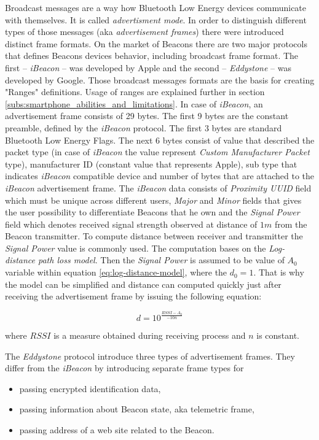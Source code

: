 \documentclass[../main.tex]{subfiles}
\begin{document}
Broadcast messages are a way how Bluetooth Low Energy devices communicate with themselves. It is called \textit{advertisment mode}. In order to distinguish different types of those messages (aka \textit{advertisement frames}) there were introduced distinct frame formats. On the market of Beacons there are two major protocols that defines Beacons devices behavior, including broadcast frame format. The first -- \textit{iBeacon} -- was developed by Apple and the second -- \textit{Eddystone} -- was developed by Google. Those broadcast messages formats are the basis for creating "Ranges" definitions. Usage of ranges are explained further in section \ref{subs:smartphone_abilities_and_limitations}. In case of \textit{iBeacon}, an advertisement frame consists of 29 bytes. The first 9 bytes are the constant preamble, defined by the \textit{iBeacon} protocol. The first 3 bytes are standard Bluetooth Low Energy Flags. The next 6 bytes consist of value that described the packet type (in case of \textit{iBeacon} the value represent \textit{Custom Manufacturer Packet} type), manufacturer ID (constant value that represents Apple), sub type that indicates \textit{iBeacon} compatible device and number of bytes that are attached to the \textit{iBeacon} advertisement frame. The \textit{iBeacon} data consists of \textit{Proximity UUID} field which must be unique across different users, \textit{Major} and \textit{Minor} fields that gives the user possibility to differentiate Beacons that he own and the \textit{Signal Power} field which denotes received signal strength observed at distance of $1 m$ from the Beacon transmitter. To compute distance between receiver and transmitter the \textit{Signal Power} value is commonly used. The computation bases on the \textit{Log-distance path loss model}. Then the \textit{Signal Power} is assumed to be value of $A_0$ variable within equation \ref{eq:log-distance-model}, where the $d_0 = 1$. That is why the model can be simplified and distance can computed quickly just after receiving the advertisement frame by issuing the following equation:

\begin{equation}
	d = 10^{\frac{RSSI-A_0}{-10n}}
\end{equation}

where $RSSI$ is a measure obtained during receiving process and $n$ is constant.

The \textit{Eddystone} protocol introduce three types of advertisement frames. They differ from the \textit{iBeacon} by introducing separate frame types for
\begin{itemize}
	\item passing encrypted identification data,
	\item passing information about Beacon state, aka telemetric frame,
	\item passing address of a web site related to the Beacon.
\end{itemize}
\end{document}
